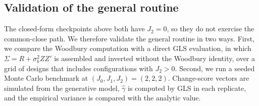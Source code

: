 \documentclass[
  11pt,
]{article}
\begin{document}
\subsection{Validation of the general routine}\label{validation-of-the-general-routine}

The closed-form checkpoints above both have \(J_2 = 0\), so
they do not exercise the common-close path. We therefore
validate the general routine in two ways. First, we compare
the Woodbury computation with a direct GLS evaluation, in
which \(\Sigma = R + \sigma_b^2 Z Z'\) is assembled and
inverted without the Woodbury identity, over a grid of
designs that includes configurations with \(J_2 > 0\).
Second, we run a seeded Monte Carlo benchmark at
\((J_0, J_1, J_2) = (2, 2, 2)\). Change-score vectors are
simulated from the generative model, \(\hat\gamma\) is
computed by GLS in each replicate, and the empirical
variance is compared with the analytic value.
\end{document}
